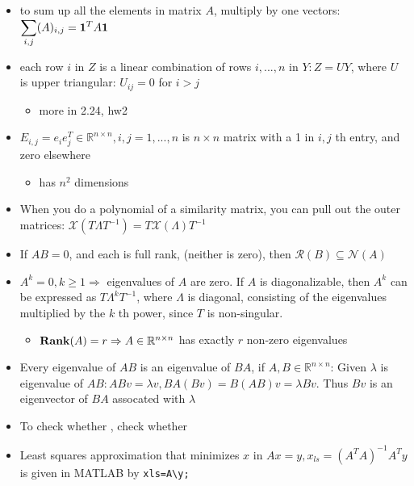 \documentclass[10pt,letterpaper]{article}
\begin{document}
\begin{itemize}
\item to sum up all the elements in matrix $A$, multiply by one vectors: $\displaystyle \sum _{i,j} (A) _{i,j} = {\bf 1} ^{T} A {\bf 1}$
\item each row $i$ in $Z$ is a linear combination of rows $i,...,n$ in $Y: Z=UY$, where $U$ is upper triangular: $U _{ij} =0$ for $i>j$

\begin{itemize}
\item more in 2.24, hw2
\end{itemize}

\item $E _{i,j} = e _{i} e _{j} ^{T} \in \mathbb{R}^{n\times n}, i,j=1,...,n$ is $n\times n$ matrix with a 1 in $i,j$ th entry, and zero elsewhere

\begin{itemize}
\item has $n^2$ dimensions
\end{itemize}

\item When you do a polynomial of a similarity matrix, you can pull out the outer matrices: $\mathcal X(T\Lambda T ^{-1} ) = T \mathcal X(\Lambda) T ^{-1}$
\item If $AB=0$, and each is full rank, (neither is zero), then $\mathcal R (B) \subseteq \mathcal N (A)$
\item $A ^{k} = 0, k\ge 1\Rightarrow$ eigenvalues of $A$ are zero. If $A$ is diagonalizable, then $A ^{k}$ can be expressed as $T \Lambda ^{k} T ^{-1}$, where $\Lambda$ is diagonal, consisting of the eigenvalues multiplied by the $k$ th power, since $T$ is non-singular.

\begin{itemize}
\item ${\bf Rank}(A)=r \Rightarrow A \in \mathbb{R}^{n\times n}$ has exactly $r$ non-zero eigenvalues
\end{itemize}

\item Every eigenvalue of $AB$ is an eigenvalue of $BA$, if $A,B \in \mathbb{R}^{n\times n}$: Given $\lambda$ is eigenvalue of $AB:ABv=\lambda v, BA(Bv)=B(AB)v=\lambda Bv$. Thus $Bv$ is an eigenvector of $BA$ assocated with $\lambda$
\item To check whether , check whether 
\item Least squares approximation that minimizes $x$ in $Ax=y, x _{ls} = (A ^{T} A) ^{-1} A ^{T} y$ is given in MATLAB by \texttt{xls=A\textbackslash{}y;}


\end{itemize}
\end{document}
